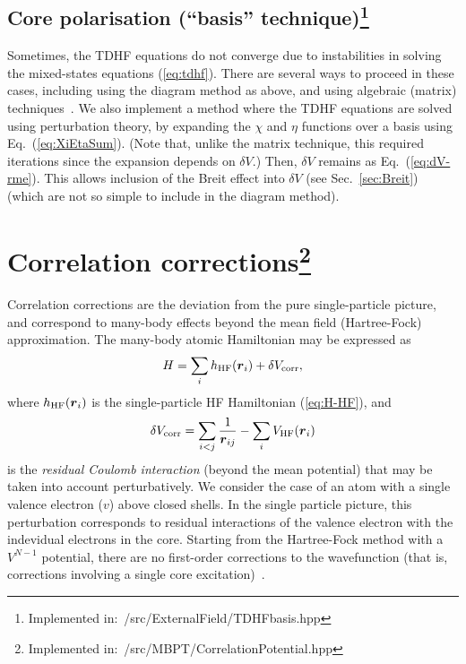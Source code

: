 \documentclass[10pt,twocolumn,a4paper]{article}%
\renewcommand{\v}[1]{\ensuremath{\boldsymbol{#1}}}		%
\newcommand{\be}{\begin{equation}}
\newcommand{\ee}{\end{equation}}
\begin{document}
\subsection[Core polarisation (``basis'' technique)]{Core polarisation (``basis'' technique)\footnote{Implemented in:~/src/ExternalField/TDHFbasis.hpp}\label{sec:RPA-basis}}
%

Sometimes, the TDHF equations do not converge due to instabilities in solving the mixed-states equations (\ref{eq:tdhf}).
There are several ways to proceed in these cases, including using the diagram method as above, and using algebraic (matrix) techniques~\cite{Johnson1989}.
We also implement a method where the TDHF equations are solved using perturbation theory, by expanding the $\chi$ and $\eta$ functions over a basis using Eq.~(\ref{eq:XiEtaSum}). (Note that, unlike the matrix technique, this required iterations since the expansion depends on $\delta V$.)
Then, $\delta V$ remains as Eq.~(\ref{eq:dV-rme}).
This allows inclusion of the Breit effect into $\delta V$ (see Sec.~\ref{sec:Breit}) (which are not so simple to include in the diagram method).





\section[Correlation corrections]{Correlation corrections\footnote{Implemented in:~/src/MBPT/CorrelationPotential.hpp}}

Correlation corrections are the deviation from the pure single-particle picture, and correspond to many-body effects beyond the mean field (Hartree-Fock) approximation.
The many-body atomic Hamiltonian may be expressed as
\be
H = \sum_i h_{\rm HF}(\v{r}_i) + \delta V_{\rm corr},
\ee
where $h_{\rm HF}(\v{r}_i)$ is the single-particle HF Hamiltonian (\ref{eq:H-HF}), and
\be\label{eq:residCoul}
\delta V_{\rm corr} = \sum_{i<j}\frac{1}{\v{r}_{ij}} - \sum_iV_{\rm HF}(\v{r}_i)
\ee
is the {\em residual Coulomb interaction} (beyond the mean potential) that may be taken into account perturbatively.
We consider the case of an atom with a single valence electron ($v$) above closed shells.
In the single particle picture, this perturbation corresponds to residual interactions of the valence electron with the indevidual electrons in the core.
Starting from the Hartree-Fock method with a $V^{N-1}$ potential, there are no first-order corrections to the wavefunction (that is, corrections involving a single core excitation)~\cite{Lindgren1986}.
\end{document}
